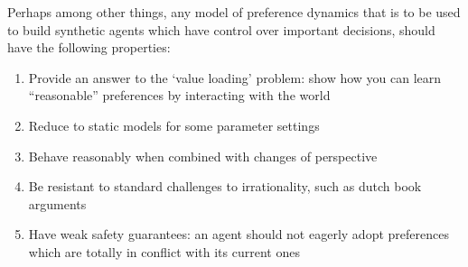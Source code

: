 \documentclass{article}
\begin{document}
	Perhaps among other things, any model of preference dynamics that is to be used to build synthetic agents which have control over important decisions, should have the following properties: 
	\begin{enumerate}[noitemsep]
		\item Provide an answer to the `value loading' problem: show how you can learn ``reasonable'' preferences by interacting with the world
		\item Reduce to static models for some parameter settings
		\item Behave reasonably when combined with changes of perspective 
		\item Be resistant to standard challenges to irrationality, such as dutch book arguments
		\item Have weak safety guarantees: an agent should not eagerly adopt preferences which are totally in conflict with its current ones
	\end{enumerate}
	
\end{document}
